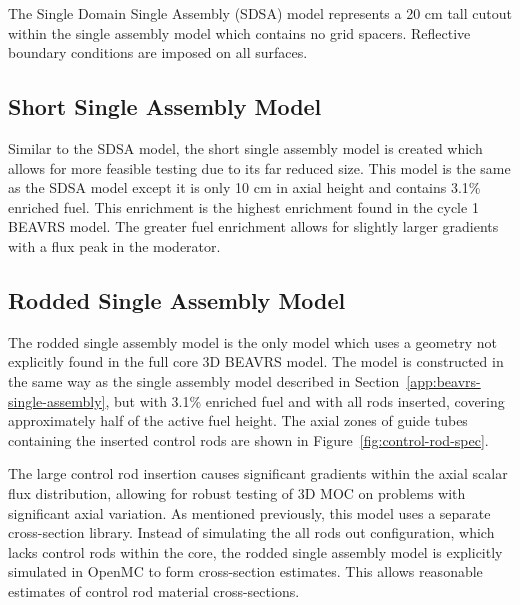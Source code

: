 The Single Domain Single Assembly (SDSA) model represents a 20 cm tall cutout within the single assembly model which contains no grid spacers. Reflective boundary conditions are imposed on all surfaces.

\subsection{Short Single Assembly Model}
\label{app:short-single-assembly}

Similar to the SDSA model, the short single assembly model is created which allows for more feasible testing due to its far reduced size. This model is the same as the SDSA model except it is only 10 cm in axial height and contains 3.1\% enriched fuel. This enrichment is the highest enrichment found in the cycle 1 BEAVRS model. The greater fuel enrichment allows for slightly larger gradients with a flux peak in the moderator.


\subsection{Rodded Single Assembly Model}
\label{app:rodded-single-assembly}

The rodded single assembly model is the only model which uses a geometry not explicitly found in the full core 3D BEAVRS model. The model is constructed in the same way as the single assembly model described in Section~\ref{app:beavrs-single-assembly}, but with 3.1\% enriched fuel and with all rods inserted, covering approximately half of the active fuel height. The axial zones of guide tubes containing the inserted control rods are shown in Figure~\ref{fig:control-rod-spec}.



The large control rod insertion causes significant gradients within the axial scalar flux distribution, allowing for robust testing of 3D \ac{MOC} on problems with significant axial variation. As mentioned previously, this model uses a separate cross-section library. Instead of simulating the all rods out configuration, which lacks control rods within the core, the rodded single assembly model is explicitly simulated in OpenMC to form cross-section estimates. This allows reasonable estimates of control rod material cross-sections.

